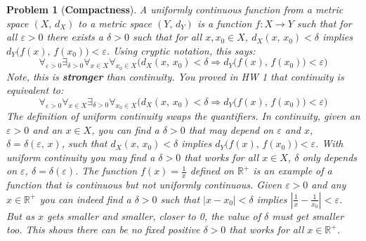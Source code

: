 \documentclass{article}
\theoremstyle{normal}
\newtheorem{problem}{Problem}
\begin{document}
    \begin{problem}[\textbf{Compactness}]
        \par\hfil\par\vspace{1em}
        A uniformly continuous function from a metric space
        $(X,\,d_{X})$ to a metric space $(Y,\,d_{Y})$ is a function
        $f:X\rightarrow{Y}$ such that for all $\varepsilon>0$ there exists
        a $\delta>0$ such that for all $x,x_{0}\in{X}$,
        $d_{X}(x,\,x_{0})<\delta$ implies
        $d_{Y}\big(f(x),\,f(x_{0})\big)<\varepsilon$.
        Using cryptic notation, this says:
        \begin{equation}
            \forall_{\varepsilon>0}\exists_{\delta>0}
                \forall_{x\in{X}}\forall_{x_{0}\in{X}}
                    \Big(d_{X}(x,\,x_{0})<\delta
                    \Rightarrow{d}_{Y}\big(f(x),\,f(x_{0})\big)<\varepsilon\Big)
        \end{equation}
        Note, this is \textbf{stronger} than continuity. You proved in HW 1
        that continuity is equivalent to:
        \begin{equation}
            \forall_{\varepsilon>0}\forall_{x\in{X}}\exists_{\delta>0}
                \forall_{x_{0}\in{X}}\Big(d_{X}(x,\,x_{0})<\delta
                    \Rightarrow{d}_{Y}\big(f(x),\,f(x_{0})\big)<\varepsilon\Big)
        \end{equation}
        The definition of uniform continuity \textit{swaps the quantifiers}.
        In continuity, given an $\varepsilon>0$ and an $x\in{X}$, you can
        find a $\delta>0$ that may depend on $\varepsilon$ and $x$,
        $\delta=\delta(\varepsilon,\,x)$, such that
        $d_{X}(x,\,x_{0})<\delta$ implies
        $d_{Y}\big(f(x),\,f(x_{0})\big)<\varepsilon$. With uniform continuity
        you may find a $\delta>0$ that works for all $x\in{X}$,
        $\delta$ only depends on $\varepsilon$, $\delta=\delta(\varepsilon)$.
        The function $f(x)=\frac{1}{x}$ defined on $\mathbb{R}^{+}$ is an
        example of a function that is continuous but not uniformly continuous.
        Given $\varepsilon>0$ and any $x\in\mathbb{R}^{+}$ you can indeed find
        a $\delta>0$ such that $|x-x_{0}|<\delta$ implies
        $|\frac{1}{x}-\frac{1}{x_{0}}|<\varepsilon$. But as $x$ gets smaller and
        smaller, closer to 0, the value of $\delta$ must get smaller too. This
        shows there can be no fixed positive $\delta>0$ that works for all
        $x\in\mathbb{R}^{+}$.
        \par\hfill\par

\end{problem}
\end{document}
